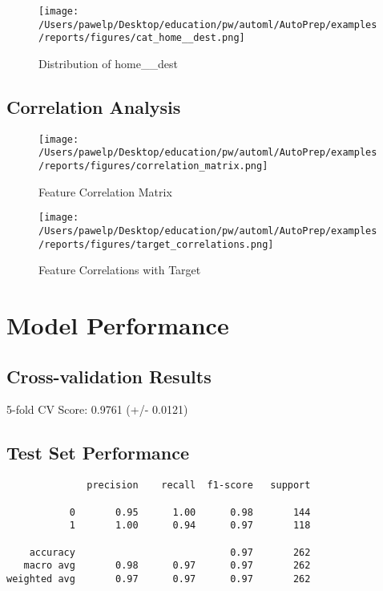 \documentclass{article}%
\begin{document}
%


\begin{figure}[H]%
\centering%
\texttt{[image: /Users/pawelp/Desktop/education/pw/automl/AutoPrep/examples/reports/figures/cat\_home\_\_dest.png]}%
\caption{Distribution of home\_\_dest}%
\end{figure}

%
\subsection{Correlation Analysis}%
\label{subsec:CorrelationAnalysis}%

%


\begin{figure}[H]%
\centering%
\texttt{[image: /Users/pawelp/Desktop/education/pw/automl/AutoPrep/examples/reports/figures/correlation\_matrix.png]}%
\caption{Feature Correlation Matrix}%
\end{figure}

%


\begin{figure}[H]%
\centering%
\texttt{[image: /Users/pawelp/Desktop/education/pw/automl/AutoPrep/examples/reports/figures/target\_correlations.png]}%
\caption{Feature Correlations with Target}%
\end{figure}

%
\section{Model Performance}%
\label{sec:ModelPerformance}%

%
\subsection{Cross{-}validation Results}%
\label{subsec:Cross{-}validationResults}%
5-fold CV Score: 0.9761 (+/- 0.0121)

%
\subsection{Test Set Performance}%
\label{subsec:TestSetPerformance}%

%
\begin{verbatim}
              precision    recall  f1-score   support

           0       0.95      1.00      0.98       144
           1       1.00      0.94      0.97       118

    accuracy                           0.97       262
   macro avg       0.98      0.97      0.97       262
weighted avg       0.97      0.97      0.97       262

\end{verbatim}%
\end{document}
